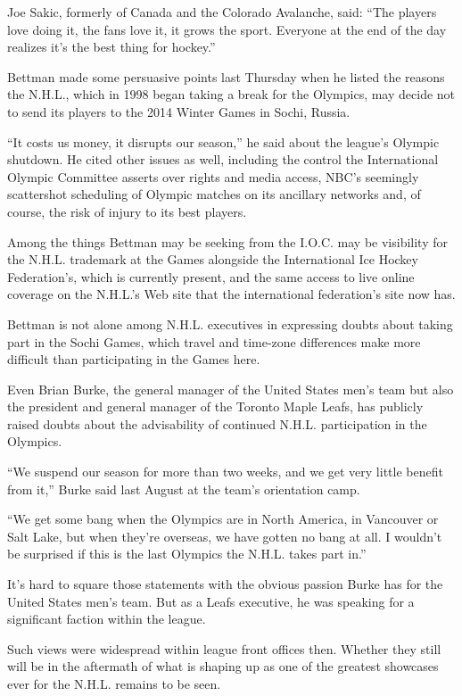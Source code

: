﻿\documentclass[12pt]{article}
\begin{document}
Joe Sakic, formerly of Canada and the Colorado Avalanche, said: ``The players love doing it, the
fans love it, it grows the sport. Everyone at the end of the day realizes it's the best thing for
hockey.''

Bettman made some persuasive points last Thursday when he listed the reasons the N.H.L., which in
1998 began taking a break for the Olympics, may decide not to send its players to the 2014 Winter
Games in Sochi, Russia.

``It costs us money, it disrupts our season,'' he said about the league's Olympic shutdown. He cited
other issues as well, including the control the International Olympic Committee asserts over rights
and media access, NBC's seemingly scattershot scheduling of Olympic matches on its ancillary
networks and, of course, the risk of injury to its best players.

Among the things Bettman may be seeking from the I.O.C. may be visibility for the N.H.L. trademark
at the Games alongside the International Ice Hockey Federation's, which is currently present, and
the same access to live online coverage on the N.H.L.'s Web site that the international federation's
site now has.

Bettman is not alone among N.H.L. executives in expressing doubts about taking part in the Sochi
Games, which travel and time-zone differences make more difficult than participating in the Games
here.

Even Brian Burke, the general manager of the United States men's team but also the president and
general manager of the Toronto Maple Leafs, has publicly raised doubts about the advisability of
continued N.H.L. participation in the Olympics.

``We suspend our season for more than two weeks, and we get very little benefit from it,'' Burke
said last August at the team's orientation camp.

``We get some bang when the Olympics are in North America, in Vancouver or Salt Lake, but when
they're overseas, we have gotten no bang at all. I wouldn't be surprised if this is the last
Olympics the N.H.L. takes part in.''

It's hard to square those statements with the obvious passion Burke has for the United States men's
team. But as a Leafs executive, he was speaking for a significant faction within the league.

Such views were widespread within league front offices then. Whether they still will be in the
aftermath of what is shaping up as one of the greatest showcases ever for the N.H.L. remains to be
seen.
\end{document}
